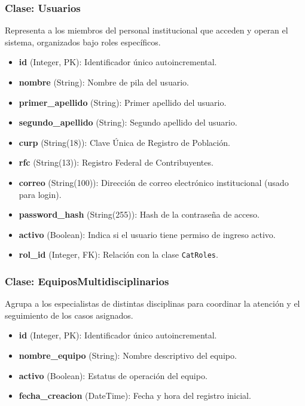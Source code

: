 \subsubsection{Clase: Usuarios}
Representa a los miembros del personal institucional que acceden y operan el sistema, organizados bajo roles específicos.
\begin{itemize}
	\item \textbf{id} (Integer, PK): Identificador único autoincremental.
	\item \textbf{nombre} (String): Nombre de pila del usuario.
	\item \textbf{primer\_apellido} (String): Primer apellido del usuario.
	\item \textbf{segundo\_apellido} (String): Segundo apellido del usuario.
	\item \textbf{curp} (String(18)): Clave Única de Registro de Población.
	\item \textbf{rfc} (String(13)): Registro Federal de Contribuyentes.
	\item \textbf{correo} (String(100)): Dirección de correo electrónico institucional (usado para login).
	\item \textbf{password\_hash} (String(255)): Hash de la contraseña de acceso.
	\item \textbf{activo} (Boolean): Indica si el usuario tiene permiso de ingreso activo.
	\item \textbf{rol\_id} (Integer, FK): Relación con la clase \texttt{CatRoles}.
\end{itemize}

\subsubsection{Clase: EquiposMultidisciplinarios}
Agrupa a los especialistas de distintas disciplinas para coordinar la atención y el seguimiento de los casos asignados.
\begin{itemize}
	\item \textbf{id} (Integer, PK): Identificador único autoincremental.
	\item \textbf{nombre\_equipo} (String): Nombre descriptivo del equipo.
	\item \textbf{activo} (Boolean): Estatus de operación del equipo.
	\item \textbf{fecha\_creacion} (DateTime): Fecha y hora del registro inicial.
\end{itemize}

